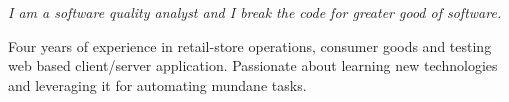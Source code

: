 \noindent \emph{I am a software quality analyst and I break the code for greater good of software.}

Four years of experience in retail-store operations, consumer goods and testing web based client/server application. Passionate about learning new technologies and leveraging it for automating mundane tasks. 